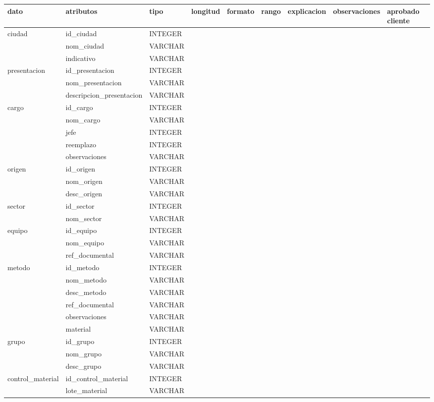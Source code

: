 \documentclass[letterpaper,10pt,spanish]{sphinxmanual}
\begin{document}
\begin{savenotes}
\begin{longtable}[c]{|l|l|l|l|l|l|l|l|l|}
dato
&
atributos
&
tipo
&
longitud
&
formato
&
rango
&
explicacion
&
observaciones
&
aprobado cliente
\\
\hline
ciudad
&
id\_ciudad
&
INTEGER
&&&&&&\\
\hline&
nom\_ciudad
&
VARCHAR
&&&&&&\\
\hline&
indicativo
&
VARCHAR
&&&&&&\\
\hline
presentacion
&
id\_presentacion
&
INTEGER
&&&&&&\\
\hline&
nom\_presentacion
&
VARCHAR
&&&&&&\\
\hline&
descripcion\_presentacion
&
VARCHAR
&&&&&&\\
\hline
cargo
&
id\_cargo
&
INTEGER
&&&&&&\\
\hline&
nom\_cargo
&
VARCHAR
&&&&&&\\
\hline&
jefe
&
INTEGER
&&&&&&\\
\hline&
reemplazo
&
INTEGER
&&&&&&\\
\hline&
observaciones
&
VARCHAR
&&&&&&\\
\hline
origen
&
id\_origen
&
INTEGER
&&&&&&\\
\hline&
nom\_origen
&
VARCHAR
&&&&&&\\
\hline&
desc\_origen
&
VARCHAR
&&&&&&\\
\hline
sector
&
id\_sector
&
INTEGER
&&&&&&\\
\hline&
nom\_sector
&
VARCHAR
&&&&&&\\
\hline
equipo
&
id\_equipo
&
INTEGER
&&&&&&\\
\hline&
nom\_equipo
&
VARCHAR
&&&&&&\\
\hline&
ref\_documental
&
VARCHAR
&&&&&&\\
\hline
metodo
&
id\_metodo
&
INTEGER
&&&&&&\\
\hline&
nom\_metodo
&
VARCHAR
&&&&&&\\
\hline&
desc\_metodo
&
VARCHAR
&&&&&&\\
\hline&
ref\_documental
&
VARCHAR
&&&&&&\\
\hline&
observaciones
&
VARCHAR
&&&&&&\\
\hline&
material
&
VARCHAR
&&&&&&\\
\hline
grupo
&
id\_grupo
&
INTEGER
&&&&&&\\
\hline&
nom\_grupo
&
VARCHAR
&&&&&&\\
\hline&
desc\_grupo
&
VARCHAR
&&&&&&\\
\hline
control\_material
&
id\_control\_material
&
INTEGER
&&&&&&\\
\hline&
lote\_material
&
VARCHAR
&&&&&&\\

\end{longtable}
\end{savenotes}
\end{document}
